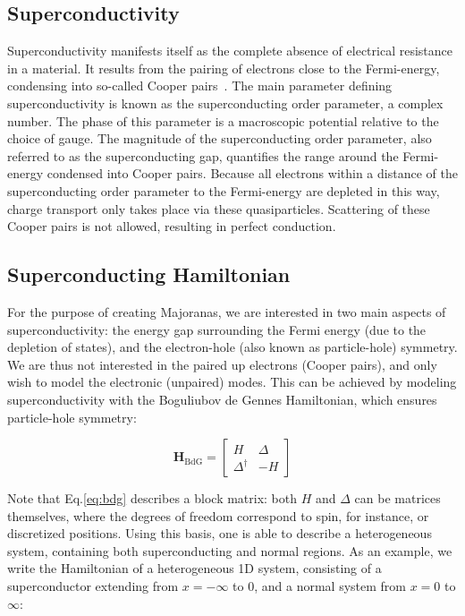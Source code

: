     \subsection{Superconductivity}
        Superconductivity manifests itself as the complete absence of electrical resistance in a material.
        It results from the pairing of electrons close to the Fermi-energy, condensing into so-called Cooper pairs~\cite{nazarov2013advanced}.
        The main parameter defining superconductivity is known as the superconducting order parameter, a complex number.
        The phase of this parameter is a macroscopic potential relative to the choice of gauge.
        The magnitude of the superconducting order parameter, also referred to as the superconducting gap, quantifies the range around the Fermi-energy condensed into Cooper pairs.
        Because all electrons within a distance of the superconducting order parameter to the Fermi-energy are depleted in this way, charge transport only takes place via these quasiparticles.
        Scattering of these Cooper pairs is not allowed, resulting in perfect conduction.

    \subsection{Superconducting Hamiltonian}
        For the purpose of creating Majoranas, we are interested in two main aspects of superconductivity: the energy gap surrounding the Fermi energy (due to the depletion of states), and the electron-hole (also known as particle-hole) symmetry.
        We are thus not interested in the paired up electrons (Cooper pairs), and only wish to model the electronic (unpaired) modes.
        This can be achieved by modeling superconductivity with the Boguliubov de Gennes Hamiltonian, which ensures particle-hole symmetry:
        
        \begin{equation}
        \mathbf{H}_\text{BdG} = \begin{bmatrix} H & \Delta \\ \Delta^\dagger & -H \end{bmatrix}
        \label{eq:bdg}
        \end{equation}

        Note that Eq.\eqref{eq:bdg} describes a block matrix: both $H$ and $\Delta$ can be matrices themselves, where the degrees of freedom correspond to spin, for instance, or discretized positions.
        Using this basis, one is able to describe a heterogeneous system, containing both superconducting and normal regions.
        As an example, we write the Hamiltonian of a heterogeneous 1D system, consisting of a superconductor extending from $x = -\infty$ to $0$, and a normal system from  $x = 0$ to $\infty$:

